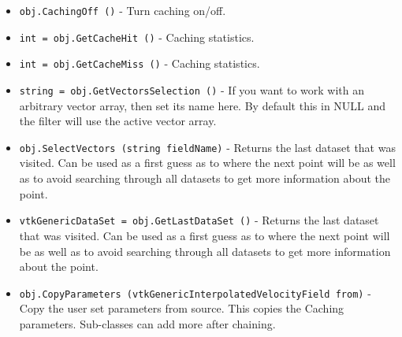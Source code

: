 \begin{itemize}
\item  \verb|obj.CachingOff ()| -  Turn caching on/off.

\item  \verb|int = obj.GetCacheHit ()| -  Caching statistics.

\item  \verb|int = obj.GetCacheMiss ()| -  Caching statistics.

\item  \verb|string = obj.GetVectorsSelection ()| -  If you want to work with an arbitrary vector array, then set its name 
 here. By default this in NULL and the filter will use the active vector 
 array.

\item  \verb|obj.SelectVectors (string fieldName)| -  Returns the last dataset that was visited. Can be used
 as a first guess as to where the next point will be as
 well as to avoid searching through all datasets to get
 more information about the point.

\item  \verb|vtkGenericDataSet = obj.GetLastDataSet ()| -  Returns the last dataset that was visited. Can be used
 as a first guess as to where the next point will be as
 well as to avoid searching through all datasets to get
 more information about the point.

\item  \verb|obj.CopyParameters (vtkGenericInterpolatedVelocityField from)| -  Copy the user set parameters from source. This copies
 the Caching parameters. Sub-classes can add more after
 chaining.

\end{itemize}
